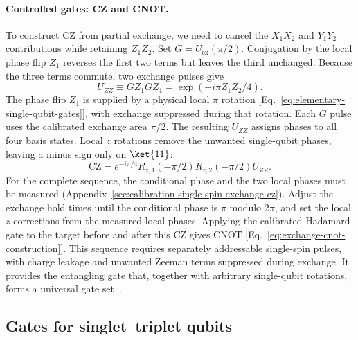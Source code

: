 \paragraph{Controlled gates: CZ and CNOT.}
To construct CZ from partial exchange, we need to cancel the
$X_1X_2$ and $Y_1Y_2$ contributions while retaining $Z_1Z_2$.
Set $G=U_{\mathrm{ex}}(\pi/2)$.
Conjugation by the local phase flip $Z_1$ reverses the first two
terms but leaves the third unchanged. Because the three terms
commute, two exchange pulses give
\begin{equation}
  U_{ZZ}\equiv G Z_1 G Z_1
       =\exp(-i\pi Z_1Z_2/4).
  \label{eq:exchange-zz-construction}
\end{equation}
The phase flip $Z_1$ is supplied by a physical local $\pi$ rotation
[Eq.~\eqref{eq:elementary-single-qubit-gates}], with exchange
suppressed during that rotation. Each $G$ pulse uses the calibrated
exchange area $\pi/2$.
The resulting $U_{ZZ}$ assigns phases to all four basis states.
Local $z$ rotations remove the unwanted single-qubit phases, leaving
a minus sign only on $\ket{11}$:
\begin{equation}
  \mathrm{CZ}
     =e^{-i\pi/4}R_{z,1}(-\pi/2)R_{z,2}(-\pi/2)U_{ZZ}.
  \label{eq:exchange-cz-construction}
\end{equation}
For the complete sequence, the conditional phase and the two local
phases must be measured
(Appendix~\ref{sec:calibration-single-spin-exchange-cz}). Adjust the
exchange hold times until the conditional phase is $\pi$ modulo
$2\pi$, and set the local $z$ corrections from the measured local
phases.
Applying the calibrated Hadamard gate to the target before and
after this CZ gives CNOT [Eq.~\eqref{eq:exchange-cnot-construction}].
This sequence requires separately addressable single-spin pulses,
with charge leakage and unwanted Zeeman terms suppressed during
exchange. It provides the entangling gate that, together with
arbitrary single-qubit rotations, forms a universal gate
set~\cite{Loss1998}.

\subsection{Gates for singlet--triplet qubits}
\label{sec:st-gates}

